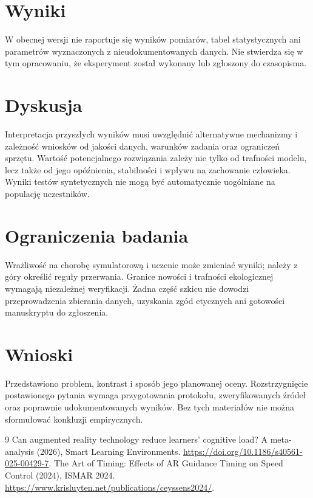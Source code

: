 \documentclass[11pt,a4paper]{article}
\begin{document}
\section{Wyniki}

W obecnej wersji nie raportuje się wyników pomiarów, tabel statystycznych ani parametrów wyznaczonych z nieudokumentowanych danych. Nie stwierdza się w tym opracowaniu, że eksperyment został wykonany lub zgłoszony do czasopisma.

\section{Dyskusja}

Interpretacja przyszłych wyników musi uwzględnić alternatywne mechanizmy i zależność wniosków od jakości danych, warunków zadania oraz ograniczeń sprzętu. Wartość potencjalnego rozwiązania zależy nie tylko od trafności modelu, lecz także od jego opóźnienia, stabilności i wpływu na zachowanie człowieka. Wyniki testów syntetycznych nie mogą być automatycznie uogólniane na populację uczestników.

\section{Ograniczenia badania}

Wrażliwość na chorobę symulatorową i uczenie może zmieniać wyniki; należy z góry określić reguły przerwania. Granice nowości i trafności ekologicznej wymagają niezależnej weryfikacji. Żadna część szkicu nie dowodzi przeprowadzenia zbierania danych, uzyskania zgód etycznych ani gotowości manuskryptu do zgłoszenia.

\section{Wnioski}

Przedstawiono problem, kontrast i sposób jego planowanej oceny. Rozstrzygnięcie postawionego pytania wymaga przygotowania protokołu, zweryfikowanych źródeł oraz poprawnie udokumentowanych wyników. Bez tych materiałów nie można sformułować konkluzji empirycznych.

\begin{thebibliography}{9}
 Can augmented reality technology reduce learners' cognitive load? A meta-analysis (2026), Smart Learning Environments. \url{https://doi.org/10.1186/s40561-025-00429-7}.
 The Art of Timing: Effects of AR Guidance Timing on Speed Control (2024), ISMAR 2024. \url{https://www.krisluyten.net/publications/ceyssens2024/}.
\end{thebibliography}
\end{document}
